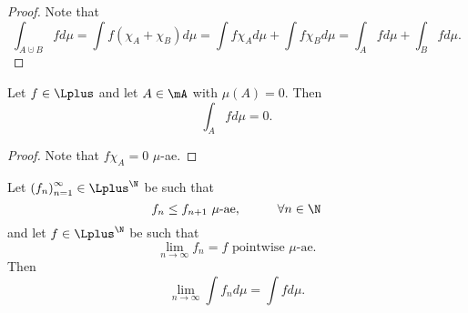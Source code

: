 \documentclass[pmath451]{subfiles}
\begin{document}
    \begin{proof}
        Note that
        \begin{equation*}
            \int_{A\cupdot B} fd\mu = \int f\left( \chi_A+\chi_B \right)d\mu = \int f\chi_Ad\mu + \int f\chi_Bd\mu = \int_Afd\mu + \int_Bfd\mu.
        \end{equation*}
    \end{proof}
    
    \begin{prop}{}
        Let $f\in\Lplus$ and let $A\in\mA$ with $\mu\left( A \right) = 0$. Then
        \begin{equation*}
            \int_Afd\mu = 0.
        \end{equation*}
    \end{prop}
    
    \begin{proof}
        Note that $f\chi_A=0$ $\mu$-ae.
    \end{proof}
    
    \clearpage

    \begin{prop}{}
        Let $\left( f_{n} \right)^{\infty}_{n=1}\in\Lplus^{\N}$ be such that
        \begin{equation*}
            f_n\leq f_{n+1} \text{ $\mu$-ae},\hspace{1cm}\forall n\in\N
        \end{equation*}
        and let $f\in\Lplus^{\N}$ be such that
        \begin{equation*}
            \lim_{n\to\infty}f_n = f\text{ pointwise $\mu$-ae}.
        \end{equation*}
        Then
        \begin{equation*}
            \lim_{n\to\infty}\int f_nd\mu = \int fd\mu.
        \end{equation*}
    \end{prop}
\end{document}
